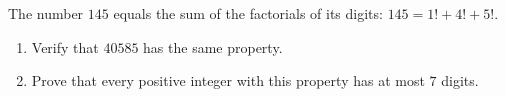 The number $145$ equals the sum of the factorials of its digits: $145=1!+4!+5!$.
\begin{enumerate}
\item[(a)] Verify that $40585$ has the same property.
\item[(b)] Prove that every positive integer with this property has at most $7$ digits.
\end{enumerate}
